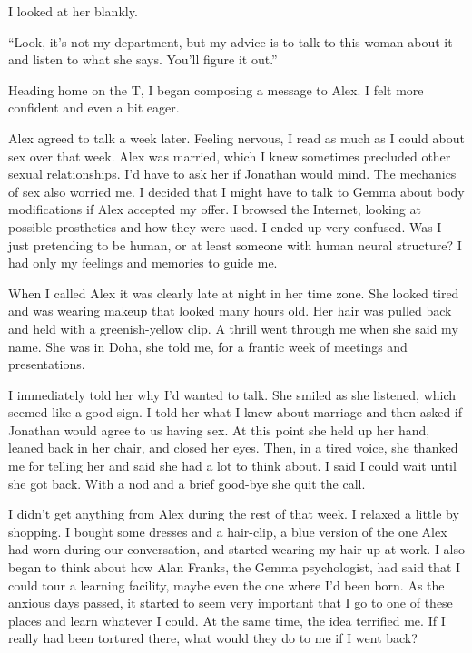 \documentclass[10pt,b5paper]{article}
\begin{document}
I looked at her blankly.

``Look, it's not my department, but my advice is to talk to this
woman about it and listen to what she says. You'll figure it out.''

Heading home on the T, I began composing a message to Alex. I felt
more confident and even a bit eager.

\bigskip

Alex agreed to talk a week later.  Feeling nervous, I read as much
as I could about sex over that week. Alex was married, which I knew
sometimes precluded other sexual relationships. I'd have to ask
her if Jonathan would mind.  The mechanics of sex also worried me. I
decided that I might have to talk to Gemma about body modifications if
Alex accepted my offer. I browsed the Internet, looking at possible
prosthetics and how they were used. I ended up very confused.  Was I
just pretending to be human, or at least someone with human neural
structure? I had only my feelings and memories to guide me.

When I called Alex it was clearly late at night in her time zone. She
looked tired and was wearing makeup that looked many hours old. Her
hair was pulled back and held with a greenish-yellow clip. A thrill
went through me when she said my name. She was in Doha, she told me,
for a frantic week of meetings and presentations.

I immediately told her why I'd wanted to talk. She smiled as she
listened, which seemed like a good sign. I told her what I knew about
marriage and then asked if Jonathan would agree to us having sex. At
this point she held up her hand, leaned back in her chair, and closed
her eyes.  Then, in a tired voice, she thanked me for telling her and
said she had a lot to think about. I said I could wait until she got
back. With a nod and a brief good-bye she quit the call.

I didn't get anything from Alex during the rest of that week.
I relaxed a little by shopping. I bought some dresses and a hair-clip,
a blue version of the one Alex had worn during our conversation,
and started wearing my hair up at work.  I also began to think about
how Alan Franks, the Gemma psychologist, had said that I could tour
a learning facility, maybe even the one where I'd been born. As the
anxious days passed, it started to seem very important that I go to
one of these places and learn whatever I could. At the same time,
the idea terrified me. If I really had been tortured there, what
would they do to me if I went back?
\end{document}
